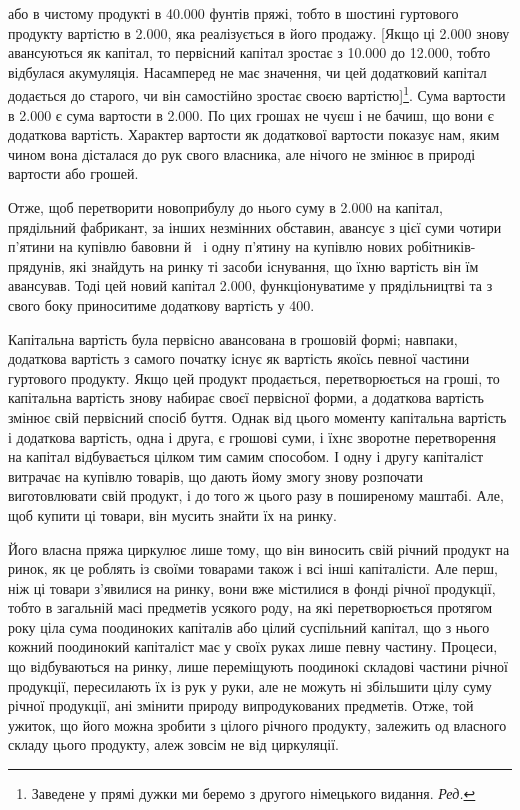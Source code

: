 \parcont{}  %
або в чистому продукті в \num{40.000} фунтів пряжі, тобто в шостині
гуртового продукту вартістю в \num{2.000}, яка
реалізується в його продажу. [Якщо ці \num{2.000}
знову авансуються як капітал, то первісний капітал зростає
з \num{10.000} до \num{12.000}, тобто
відбулася акумуляція. Насамперед не має значення, чи цей додатковий
капітал додається до старого, чи він самостійно зростає
своєю вартістю]\footnote*{
Заведене у прямі дужки ми беремо з другого німецького видання.
\emph{Ред.}
}. Сума вартости в \num{2.000} є сума
вартости в \num{2.000}. По цих грошах не чуєш і не
бачиш, що вони є додаткова вартість. Характер вартости як додаткової
вартости показує нам, яким чином вона дісталася до
рук свого власника, але нічого не змінює в природі вартости
або грошей.

Отже, щоб перетворити новоприбулу до нього суму в \num{2.000} на капітал, прядільний фабрикант, за інших незмінних
обставин, авансує з цієї суми чотири п’ятини на купівлю
бавовни й~ і одну п’ятину на купівлю нових робітників-прядунів,
які знайдуть на ринку ті засоби існування, що їхню вартість
він їм авансував. Тоді цей новий капітал \num{2.000}, функціонуватиме у прядільництві та з свого боку
приноситиме додаткову вартість у 400.

Капітальна вартість була первісно авансована в грошовій
формі; навпаки, додаткова вартість з самого початку існує як
вартість якоїсь певної частини гуртового продукту. Якщо цей
продукт продається, перетворюється на гроші, то капітальна
вартість знову набирає своєї первісної форми, а додаткова вартість
змінює свій первісний спосіб буття. Однак від цього моменту
капітальна вартість і додаткова вартість, одна і друга, є грошові
суми, і їхнє зворотне перетворення на капітал відбувається цілком
тим самим способом. І одну і другу капіталіст витрачає на
купівлю товарів, що дають йому змогу знову розпочати виготовлювати
свій продукт, і до того ж цього разу в поширеному
маштабі. Але, щоб купити ці товари, він мусить знайти їх на ринку.

Його власна пряжа циркулює лише тому, що він виносить
свій річний продукт на ринок, як це роблять із своїми товарами
також і всі інші капіталісти. Але перш, ніж ці товари з’явилися
на ринку, вони вже містилися в фонді річної продукції, тобто в
загальній масі предметів усякого роду, на які перетворюється
протягом року ціла сума поодиноких капіталів або цілий суспільний
капітал, що з нього кожний поодинокий капіталіст має
у своїх руках лише певну частину. Процеси, що відбуваються на
ринку, лише переміщують поодинокі складові частини річної
продукції, пересилають їх із рук у руки, але не можуть ні збільшити
цілу суму річної продукції, ані змінити природу випродукованих
предметів. Отже, той ужиток, що його можна зробити
з цілого річного продукту, залежить од власного складу цього
продукту, алеж зовсім не від циркуляції.
